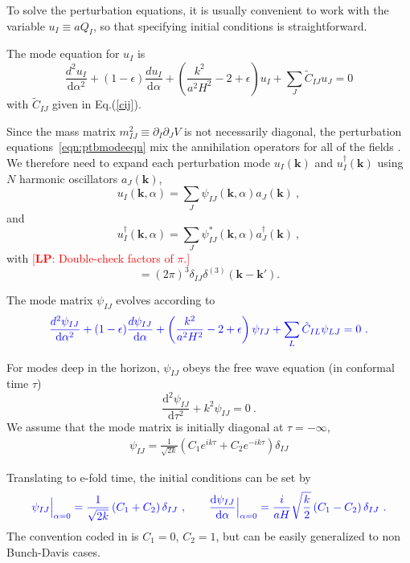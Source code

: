 \documentclass[11pt]{article}
\newcommand{\ud}{\mathrm{d}}
\newcommand{\pd}{\partial}
\def\bk{{\mathbf{k}}}
\def\tilC{{\tilde C}}
\newcommand{\lp}[1]{\textcolor{red}{[{\bf LP}: #1]}}
\begin{document}
To solve the perturbation equations, it is usually convenient to work with the variable $u_I \equiv a Q_I$, so that specifying initial conditions is straightforward. 

The mode equation for $u_I$ is 
\begin{equation}
\frac{d^2 u_I}{\ud \alpha^2} + (1-\epsilon) \frac{d u_I}{\ud \alpha} + \left(\frac{k^2}{a^2H^2} - 2 + \epsilon \right) u_I + \sum_J \tilC_{IJ} u_J = 0
\label{eqn:ptbmodeeqn}
\end{equation}
with $\tilC_{IJ}$ given in Eq.(\ref{cij}).

Since the mass matrix $m^2_{IJ} \equiv \pd_I\pd_J V$ is not necessarily diagonal, the perturbation equations~\eqref{eqn:ptbmodeeqn} mix the annihilation operators for all of the fields \cite{Salopek:1988qh}. We therefore need to expand each perturbation mode $u_I(\bk)$ and $u_I^\dagger(\bk)$ using $N$ harmonic oscillators $a_J(\bk)$,
\begin{equation}
u_I(\bk, \alpha) = \sum_J \psi_{IJ}(\bk, \alpha) a_J(\bk) ~,
\end{equation}
and
\begin{equation}
u_I^\dagger(\bk, \alpha) = \sum_J \psi_{IJ}^*(\bk, \alpha) a_J^\dagger(\bk) ~,
\end{equation}
with \lp{Double-check factors of $\pi$.}
\begin{equation}
[ a_J(\bk), a^\dagger_I(\bk')] = (2\pi)^3 \delta_{IJ} \delta^{(3)}(\bk - \bk').
\end{equation}

The mode matrix $\psi_{IJ}$ evolves according to 
\begin{equation}
{\color{blue}
\frac{d^2 \psi_{IJ}}{\ud \alpha^2} + (1-\epsilon) \frac{d \psi_{IJ}}{\ud \alpha} + \left(\frac{k^2}{a^2H^2} - 2 + \epsilon \right) \psi_{IJ} + \sum_L \tilC_{IL} \psi_{LJ} = 0 ~. \label{mmeq} }
\end{equation}

For modes deep in the horizon, $\psi_{IJ}$ obeys the free wave equation (in conformal time $\tau$)
\begin{equation}
\frac{\ud^2 \psi_{IJ}}{\ud \tau^2} + k^2 \psi_{IJ} = 0 ~. 
\end{equation}
We assume that the mode matrix is initially diagonal at $\tau = -\infty$, 
\begin{eqnarray}
\psi_{IJ} = \frac{1}{\sqrt{2k}}\left( C_1 e^{ik\tau} + C_2 e^{-ik\tau} \right) \delta_{IJ}
\end{eqnarray}

Translating to e-fold time, the initial conditions can be set by
\begin{equation}
{\color{blue}
 \psi_{IJ}\Big|_{\alpha=0} = \frac{1}{\sqrt{2k}}\, (C_1 + C_2)\, \delta_{IJ} ~, 
\quad\quad 
\frac{\ud \psi_{IJ}}{\ud \alpha}\Big|_{\alpha=0} = \frac{i}{aH}\sqrt{\frac{k}{2}}\,(C_1 - C_2)\,\delta_{IJ} ~. }
\end{equation}
The convention coded in is $C_1 = 0$, $C_2 = 1$, but can be easily generalized to non Bunch-Davis cases. 
\end{document}
